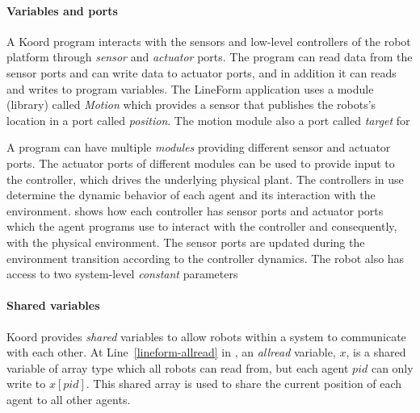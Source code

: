 \paragraph{Variables and ports}
A Koord program interacts with the sensors and low-level controllers of the robot platform through \emph{sensor} and \emph{actuator} ports. The program can read data from the sensor ports and can write data to actuator ports, and in addition it can reads and writes to program variables.
%
The {\sf LineForm} application uses a module (library) called {\em Motion\/} which provides a sensor that publishes the robots's location in a port called {\em position\/}. The motion module also a port called {\em target\/} for 


A \lgname program can have multiple \emph{modules} providing different sensor and actuator ports.
The actuator ports of different modules can be used to provide input to the controller, which drives the underlying physical plant.
The controllers in use determine the dynamic behavior of each agent and its interaction with the environment.
 shows how each controller has sensor ports and actuator ports which the agent programs use to interact with the controller and consequently, with the physical environment.
The sensor ports are updated during the environment transition according to the controller dynamics.
%
The robot also has access to two system-level \emph{constant} parameters


\paragraph{Shared variables}
Koord provides \emph{shared} variables to allow robots within a system to communicate with each other.
At Line~\ref{lineform-allread} in , an \emph{allread} variable, $x$, is a shared variable of array type which all robots can read from,
but each agent $pid$ can only write to $x[pid]$.
This shared array is used to share the current position of each agent to all other agents.


